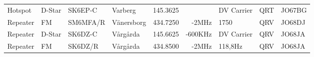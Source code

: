 \begin{landscape}
\begin{longtable}{llllrrlcl}
	Hotspot                   & D-Star        & SK6EP-C       & Varberg             & 145.3625          &                & DV Carrier       & QRT             & JO67BG           \\
	Repeater                  & FM            & SM6MFA/R      & Vänersborg          & 434.7250          & -2MHz          & 1750             & QRV             & JO68DJ           \\
	Repeater                  & D-Star        & SK6DZ-C       & Vårgårda            & 145.6625          & -600KHz        & DV Carrier       & QRV             & JO68JA           \\
	Repeater                  & FM            & SK6DZ/R       & Vårgårda            & 434.8500          & -2MHz          & 118,8Hz          & QRV             & JO68JA
\end{longtable}
\normalsize

\end{landscape}
